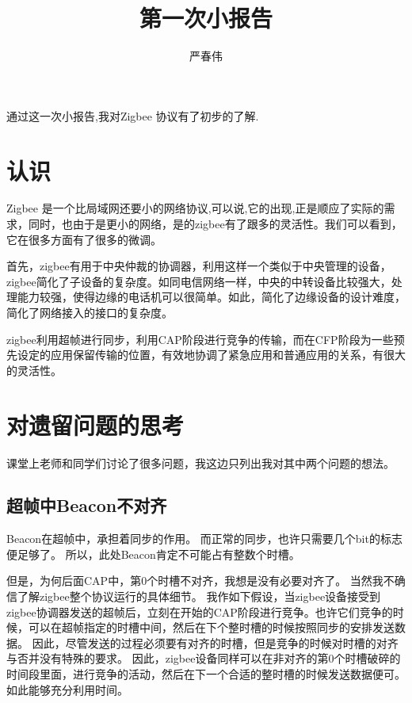 \documentclass[a4paper]{ctexart}
\author{严春伟}
\title{第一次小报告}
\begin{document}
    \maketitle
通过这一次小报告,我对Zigbee 协议有了初步的了解. 
\section{认识}
\par
Zigbee 是一个比局域网还要小的网络协议,可以说,它的出现,正是顺应了实际的需求，同时，也由于是更小的网络，是的zigbee有了跟多的灵活性。我们可以看到，它在很多方面有了很多的微调。
\par
首先，zigbee有用于中央仲裁的协调器，利用这样一个类似于中央管理的设备，zigbee简化了子设备的复杂度。如同电信网络一样，中央的中转设备比较强大，处理能力较强，使得边缘的电话机可以很简单。如此，简化了边缘设备的设计难度，简化了网络接入的接口的复杂度。
\par
zigbee利用超帧进行同步，利用CAP阶段进行竞争的传输，而在CFP阶段为一些预先设定的应用保留传输的位置，有效地协调了紧急应用和普通应用的关系，有很大的灵活性。

\section{对遗留问题的思考}
课堂上老师和同学们讨论了很多问题，我这边只列出我对其中两个问题的想法。

\subsection{超帧中Beacon不对齐}
Beacon在超帧中，承担着同步的作用。 而正常的同步，也许只需要几个bit的标志便足够了。 所以，此处Beacon肯定不可能占有整数个时槽。
\par
但是，为何后面CAP中，第0个时槽不对齐，我想是没有必要对齐了。 当然我不确信了解zigbee整个协议运行的具体细节。 我作如下假设，当zigbee设备接受到zigbee协调器发送的超帧后，立刻在开始的CAP阶段进行竞争。也许它们竞争的时候，可以在超帧指定的时槽中间，然后在下个整时槽的时候按照同步的安排发送数据。 因此，尽管发送的过程必须要有对齐的时槽，但是竞争的时候对时槽的对齐与否并没有特殊的要求。 因此，zigbee设备同样可以在非对齐的第0个时槽破碎的时间段里面，进行竞争的活动，然后在下一个合适的整时槽的时候发送数据便可。 如此能够充分利用时间。
\end{document}
